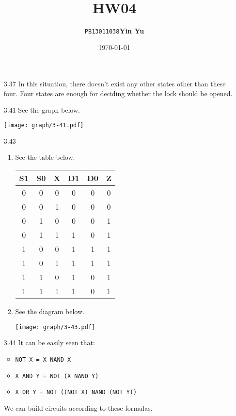 \documentclass[a4paper]{article}
\title{\textbf{HW04}}
\author{\texttt{PB13011038}\quad\textbf{Yin Yu}}
\date{\today}
\begin{document}
\maketitle

\begin{enumerate}

\item[3.37] In this situation, there doesn't exist any other states
  other than these four. Four states are enough for deciding whether
  the lock should be opened.

\item[3.41] See the graph below.
  \begin{center}
    \texttt{[image: graph/3-41.pdf]}
  \end{center}

\item[3.43]
  \begin{enumerate}
    \item See the table below.
      \begin{center}
        \begin{tabular}{ccc|ccc}
          \hline
          S1 & S0 & X & D1 & D0 & Z \\
          \hline
          0 & 0 & 0 & 0 & 0 & 0 \\
          0 & 0 & 1 & 0 & 0 & 0 \\
          0 & 1 & 0 & 0 & 0 & 1 \\
          0 & 1 & 1 & 1 & 0 & 1 \\
          1 & 0 & 0 & 1 & 1 & 1 \\
          1 & 0 & 1 & 1 & 1 & 1 \\
          1 & 1 & 0 & 1 & 0 & 1 \\
          1 & 1 & 1 & 1 & 0 & 1 \\
          \hline
        \end{tabular}
      \end{center}
    \item See the diagram below.
      \begin{center}
        \texttt{[image: graph/3-43.pdf]}
      \end{center}
  \end{enumerate}

\item[3.44] It can be easily seen that:
  \begin{itemize}
  \item \verb+NOT X = X NAND X+
  \item \verb+X AND Y = NOT (X NAND Y)+
  \item \verb+X OR Y = NOT ((NOT X) NAND (NOT Y))+
  \end{itemize}
  We can build circuits according to these formulas.

\end{enumerate}
\end{document}
